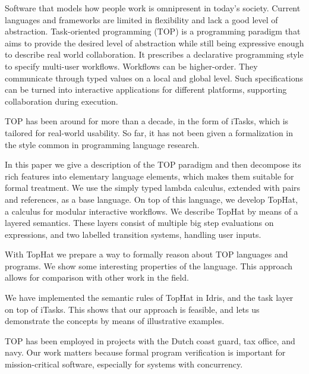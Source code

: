 
Software that models how people work is omnipresent in today's society.
Current languages and frameworks are limited in flexibility and lack a good level of abstraction.
Task-oriented programming (TOP) is a programming paradigm that aims to provide the desired level of abstraction while still being expressive enough to describe real world collaboration.
It prescribes a declarative programming style to specify multi-user workflows.
Workflows can be higher-order.
They communicate through typed values on a local and global level.
Such specifications can be turned into interactive applications for different platforms, supporting collaboration during execution.

TOP has been around for more than a decade, in the form of iTasks, which is tailored for real-world usability.
So far, it has not been given a formalization in the style common in programming language research.

In this paper we give a description of the TOP paradigm and then decompose its rich features into elementary language elements, which makes them suitable for formal treatment.
We use the simply typed lambda calculus, extended with pairs and references, as a base language.
On top of this language, we develop TopHat, a calculus for modular interactive workflows.
We describe TopHat by means of a layered semantics.
These layers consist of multiple big step evaluations on expressions, and two labelled transition systems, handling user inputs.

With TopHat we prepare a way to formally reason about TOP languages and programs.
We show some interesting properties of the language.
This approach allows for comparison with other work in the field.

We have implemented the semantic rules of TopHat in Idris, and the task layer on top of iTasks.
This shows that our approach is feasible, and lets us demonstrate the concepts by means of illustrative examples.

TOP has been employed in projects with the Dutch coast guard, tax office, and navy.
Our work matters because formal program verification is important for mission-critical software, especially for systems with concurrency.



